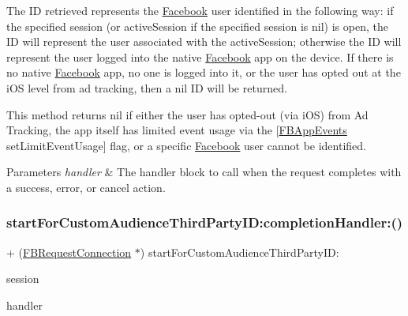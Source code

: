 The ID retrieved represents the \hyperlink{interfaceFacebook}{Facebook} user identified in the following way\+: if the specified session (or active\+Session if the specified session is {\ttfamily nil}) is open, the ID will represent the user associated with the active\+Session; otherwise the ID will represent the user logged into the native \hyperlink{interfaceFacebook}{Facebook} app on the device. If there is no native \hyperlink{interfaceFacebook}{Facebook} app, no one is logged into it, or the user has opted out at the i\+OS level from ad tracking, then a {\ttfamily nil} ID will be returned.

This method returns {\ttfamily nil} if either the user has opted-\/out (via i\+OS) from Ad Tracking, the app itself has limited event usage via the {\ttfamily \mbox{[}\hyperlink{interfaceFBAppEvents}{F\+B\+App\+Events} set\+Limit\+Event\+Usage\mbox{]}} flag, or a specific \hyperlink{interfaceFacebook}{Facebook} user cannot be identified.


\begin{DoxyParams}{Parameters}
{\em handler} & The handler block to call when the request completes with a success, error, or cancel action. \\
\hline
\end{DoxyParams}
\mbox{\label{interfaceFBRequestConnection_ab2ed1b7d417b4c723b37512870a5add9}} 
\subsubsection{\texorpdfstring{start\+For\+Custom\+Audience\+Third\+Party\+I\+D\+:completion\+Handler\+:()}{startForCustomAudienceThirdPartyID:completionHandler:()}\hspace{0.1cm}{\footnotesize\ttfamily [3/5]}}
{\footnotesize\ttfamily + (\hyperlink{interfaceFBRequestConnection}{F\+B\+Request\+Connection} $\ast$) start\+For\+Custom\+Audience\+Third\+Party\+I\+D\+: \begin{DoxyParamCaption}\item[{(\hyperlink{interfaceFBSession}{F\+B\+Session} $\ast$)}]{session }\item[{completionHandler:(F\+B\+Request\+Handler)}]{handler }\end{DoxyParamCaption}}

